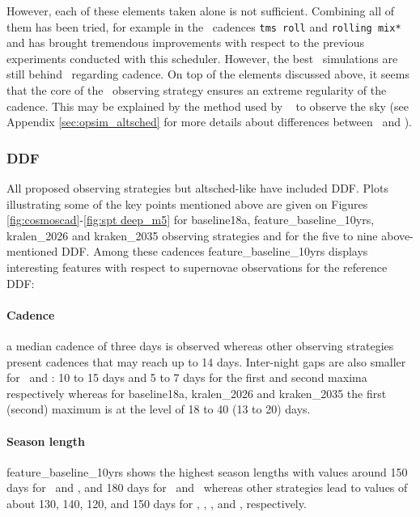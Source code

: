 However, each of these elements taken alone is not
sufficient. Combining all of them has been tried, for example in the
\slair~cadences {\tt tms\ roll} and {\tt rolling mix*} and has brought
tremendous improvements with respect to the previous experiments
conducted with this scheduler.  However, the best \slair~simulations
are still behind \altschedsched~regarding cadence.  On top of the elements
discussed above, it seems that the core of the \altschedsched~observing strategy ensures
an extreme regularity of the cadence. This may be explained by the method used by \altsched~ to observe the sky (see Appendix \ref{sec:opsim_altsched} for more details about differences between \opsim~and \altsched).

\begin{comment}
nrl, 2018-09-27: we still need to estimate (1) the same-filter
 1-day gaps (2) the cadence rms. I think that would help
understanding the difference between the best SLAIR cadences and
Altsched.
\end{comment}



\subsubsection{DDF}


All proposed observing strategies but altsched-like have included DDF.
Plots illustrating some of the key points mentioned above are given on Figures \ref{fig:cosmoscad}-\ref{fig:spt deep_m5} for baseline18a, feature\_baseline\_10yrs, kralen\_2026 and kraken\_2035 observing strategies and for the five to nine above-mentioned DDF. Among these cadences feature\_baseline\_10yrs displays interesting features with respect to supernovae observations for the reference DDF:

\paragraph{Cadence} a median cadence of three days is observed whereas other observing strategies present cadences that may reach up to 14 days. Inter-night gaps are also smaller for \cosmos~and \xmmlss: 10 to 15 days and 5 to 7 days for the first and second maxima respectively whereas  for baseline18a, kralen\_2026 and kraken\_2035 the first (second) maximum is at the level of 18 to 40 (13 to 20) days.  

\paragraph{Season length} feature\_baseline\_10yrs shows the highest season lengths with values around 150 days for \cosmos~and \xmmlss, and 180 days for \cdfs~and \elais~whereas other strategies lead to values of about 130, 140, 120, and 150 days for \cosmos, \xmmlss, \cdfs, and \elais, respectively.

